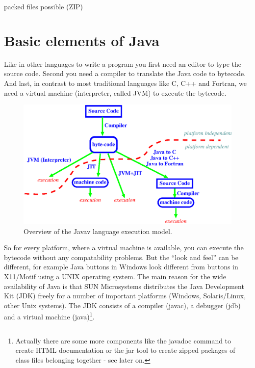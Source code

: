 packed files possible (ZIP)


\section{Basic elements of Java}
\label{sec:Basic_elements_of_Java}
Like in other languages to write a program you first need an editor
to type the source code. Second you need a compiler to translate
the Java code to bytecode. And last, in contrast to most
traditional languages like C, C++ and Fortran, we need a virtual
machine (interpreter, called JVM) to execute the bytecode.

\begin{figure}[htbp]
  \begin{center}
    \leavevmode
    \includegraphics{Figures/Java_Overview.eps}
    \caption{Overview of the Javav language execution model.}
    \label{fig:Java_Overview}
  \end{center}
\end{figure}

So for every platform, where a virtual machine is available,
you can execute the bytecode without any compatability problems.
But the ``look and feel'' can be different, for example Java buttons
in Windows look different from buttons in X11/Motif using a UNIX
operating system. The main reason for the wide availability of Java
is that SUN Microsystems distributes the Java Development Kit (JDK)
freely for a number of important platforms (Windows, Solaris/Linux,
other Unix systems). The JDK consists of a compiler (javac), a
debugger (jdb) and a virtual machine (java)\footnote{Actually there
are some more components like the javadoc command to create HTML
documentation or the jar tool to create zipped packages of
class files belonging together - see later on.}.

